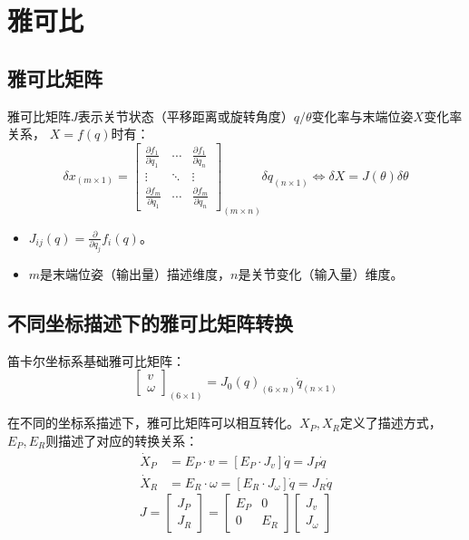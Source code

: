 \documentclass[
12pt, %
a4paper, 
oneside, %
headinclude,footinclude, %
]{scrartcl}
\begin{document}
\section{雅可比}
\subsection{雅可比矩阵}
雅可比矩阵$ J $表示关节状态（平移距离或旋转角度）$ q/\theta $变化率与末端位姿$ X $变化率关系，
$ X = f(q) $时有：
$$
\delta x_{(m \times 1)} = 
\begin{bmatrix}
\frac{\partial f_1}{\partial q_1} & \cdots & \frac{\partial f_1}{\partial q_n} \\
\vdots & \ddots & \vdots \\
\frac{\partial f_m}{\partial q_1} & \cdots & \frac{\partial f_m}{\partial q_n}
\end{bmatrix}_{(m \times n)}
\delta q_{(n \times 1)}
\Leftrightarrow 
\delta X = J(\theta)\delta \theta
$$
\begin{itemize}
\item $ J_{ij}(q) = \frac{\partial}{\partial q_j} f_i(q) $。
\item $ m $是末端位姿（输出量）描述维度，$ n $是关节变化（输入量）维度。
\end{itemize} 
\subsection{不同坐标描述下的雅可比矩阵转换}
笛卡尔坐标系基础雅可比矩阵：
$$ \begin{bmatrix} v \\ \omega \end{bmatrix}_{(6 \times 1)} = J_0(q)_{(6 \times n)} \dot{q}_{(n \times 1)} $$

在不同的坐标系描述下，雅可比矩阵可以相互转化。$ X_P,X_R $定义了描述方式，$ E_P,E_R $则描述了对应的转换关系：
\begin{align*}
\dot{X}_P &= E_P \cdot v = [E_P \cdot J_v] \dot{q} = J_P \dot{q} \\
\dot{X}_R &= E_R \cdot \omega = [E_R \cdot J_\omega] \dot{q} = J_R \dot{q}
\end{align*}
$$
J = 
\begin{bmatrix} J_P \\ J_R \end{bmatrix}
=
\begin{bmatrix} E_P & 0 \\ 0 & E_R \end{bmatrix}
\begin{bmatrix} J_v \\ J_\omega \end{bmatrix}
$$
\end{document}
